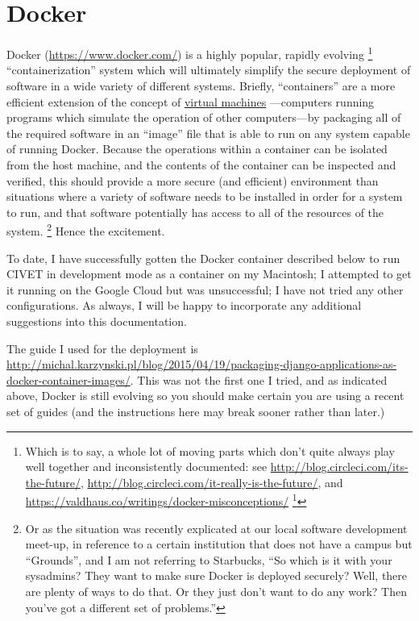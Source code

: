\documentclass[letterpaper,10pt,english]{sphinxmanual}
\begin{document}
\section{Docker}
\label{appendix4:docker}
Docker (\href{https://www.docker.com/}{https://www.docker.com/}) is a highly popular, rapidly evolving \footnote{
Which is to say, a whole lot of moving parts which don't quite always play well together and inconsistently documented:
see   \href{http://blog.circleci.com/its-the-future/}{http://blog.circleci.com/its-the-future/},
\href{http://blog.circleci.com/it-really-is-the-future/}{http://blog.circleci.com/it-really-is-the-future/}, and \href{https://valdhaus.co/writings/docker-misconceptions/}{https://valdhaus.co/writings/docker-misconceptions/} \footnote{
Thanks to John Beieler for the links.
}
} “containerization” system which will ultimately simplify the secure deployment
of software in a wide variety of different systems. Briefly, “containers” are a more efficient extension of the concept of
\href{https://en.wikipedia.org/wiki/Virtual\_machine}{virtual machines} —computers running programs which simulate the operation
of other computers—by packaging all of the required software in an “image” file that is able to run on any system capable of
running Docker. Because the operations within a container can be isolated from the host machine, and the contents of the
container can be inspected and verified, this should provide a more secure (and efficient) environment than situations where
a variety of software
needs to be installed in order for a system to run, and that software potentially has access to all of the resources of the system. \footnote{
Or as the situation was recently explicated at our local software development meet-up, in reference
to a certain institution that does not have a campus but “Grounds”, and I am not referring to Starbucks, “So which
is it with your sysadmins? They want to make sure Docker is deployed securely? Well, there are plenty of ways to do
that. Or they just don't want to do any work? Then you've got a different set of problems.”
}
Hence the excitement.

To date, I have successfully gotten the Docker container described below to run CIVET in development mode as a container on my
Macintosh; I attempted to get it running on the Google Cloud but was unsuccessful; I have not tried any other configurations.
As always, I will be happy to incorporate any additional suggestions into this documentation.

The guide I used for the deployment is \href{http://michal.karzynski.pl/blog/2015/04/19/packaging-django-applications-as-docker-container-images/}{http://michal.karzynski.pl/blog/2015/04/19/packaging-django-applications-as-docker-container-images/}.
This was not the first one I tried, and as indicated above, Docker is still evolving
so you should make certain you are using a recent set of guides (and the instructions here may break sooner rather than
later.)
\end{document}

